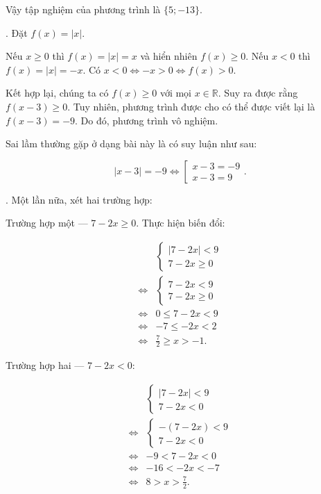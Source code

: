 Vậy tập nghiệm của phương trình là $\{5; -13\}$.

. Đặt $f(x) = |x|$.

Nếu \textcolor{colorEmphasisCyan}{$x \geq 0$} thì $f(x) = |x| = x$ và hiển nhiên $f(x) \geq 0$. Nếu \textcolor{colorEmphasis}{$x < 0$} thì $f(x) = |x| = -x$. Có $x < 0 \iff -x > 0 \iff f(x) > 0$.

Kết hợp lại, chúng ta có $f(x) \geq 0$ với mọi $x \in \mathbb{R}$. Suy ra được rằng $f(x - 3) \geq 0$. Tuy nhiên, phương trình được cho có thể được viết lại là $f(x - 3) = -9$. Do đó, phương trình vô nghiệm.

Sai lầm thường gặp ở dạng bài này là có suy luận như sau:

\begin{equation*}
   |x - 3| = -9 \iff \left[\begin{array}{l}
      x - 3 = -9 \\
      x - 3 = 9
   \end{array}\right..
\end{equation*}

. Một lần nữa, xét hai trường hợp:

\textcolor{colorEmphasisCyan}{Trường hợp một --- $7 - 2x \geq 0$}. Thực hiện biến đổi:

\begin{align*}
   &\begin{cases}
      |7 - 2x| < 9 \\
      7 - 2x \geq 0
   \end{cases} \\
   \iff &\begin{cases}
      7 - 2x < 9 \\
      7 - 2x \geq 0
   \end{cases} \\
   \iff &0 \leq 7 - 2x < 9 \\
   \iff &-7 \leq -2x < 2 \\
   \iff &\frac{7}{2} \geq x > -1.
\end{align*}

\textcolor{colorEmphasis}{Trường hợp hai --- $7 - 2x < 0$}:

\begin{align*}
   &\begin{cases}
      |7 - 2x| < 9 \\
      7 - 2x < 0
   \end{cases} \\
   \iff &\begin{cases}
      - (7 - 2x) < 9 \\
      7 - 2x < 0
   \end{cases} \\
   \iff & -9 < 7 - 2x < 0 \\
   \iff & -16 < -2x < -7 \\
   \iff & 8 > x > \frac{7}{2}.
\end{align*}

